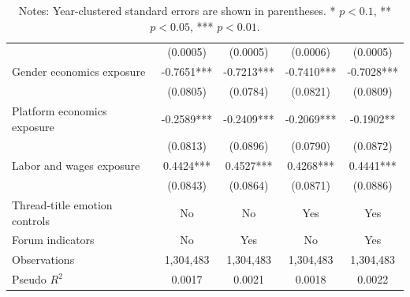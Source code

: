 \documentclass[11pt]{article}
\begin{document}
\begin{table}[!htbp]
{\begin{tabular}{lcccc}
         & (0.0005) & (0.0005) & (0.0006) & (0.0005) \\
        Gender economics exposure & -0.7651*** & -0.7213*** & -0.7410*** & -0.7028*** \\
         & (0.0805) & (0.0784) & (0.0821) & (0.0809) \\
        Platform economics exposure & -0.2589*** & -0.2409*** & -0.2069*** & -0.1902** \\
         & (0.0813) & (0.0896) & (0.0790) & (0.0872) \\
        Labor and wages exposure & 0.4424*** & 0.4527*** & 0.4268*** & 0.4441*** \\
         & (0.0843) & (0.0864) & (0.0871) & (0.0886) \\
        \midrule
        Thread-title emotion controls & No & No & Yes & Yes \\
        Forum indicators & No & Yes & No & Yes \\
        Observations & 1,304,483 & 1,304,483 & 1,304,483 & 1,304,483 \\
        Pseudo $R^2$ & 0.0017 & 0.0021 & 0.0018 & 0.0022 \\
        \bottomrule
    \end{tabular}}
    {\captionsetup{justification=raggedright,singlelinecheck=false}
    \caption*{\footnotesize Notes: Year-clustered standard errors are shown in parentheses. * \(p<0.1\), ** \(p<0.05\), *** \(p<0.01\).}}
\end{table}
\end{document}
